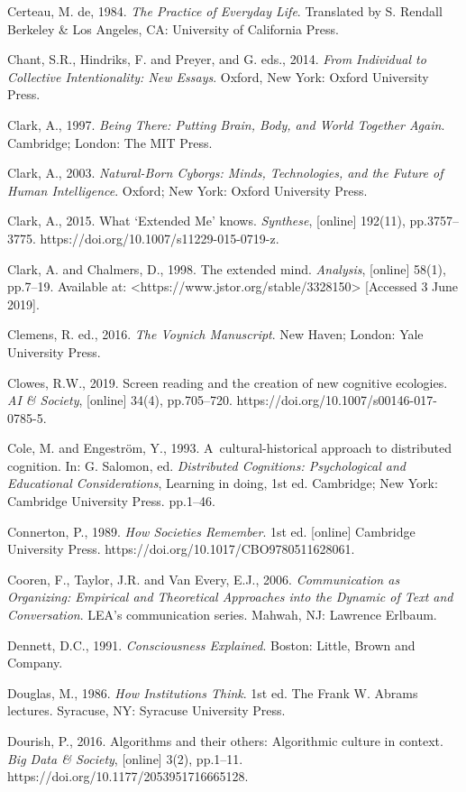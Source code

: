 Certeau, M. de, 1984. \textit{The Practice of Everyday Life}. Translated by S. Rendall Berkeley \& Los Angeles, CA: University of California Press.

Chant, S.R., Hindriks, F. and Preyer, and G. eds., 2014. \textit{From Individual to Collective Intentionality: New Essays}. Oxford, New York: Oxford University Press.

Clark, A., 1997. \textit{Being There: Putting Brain, Body, and World Together Again}. Cambridge; London: The MIT Press.

Clark, A., 2003. \textit{Natural-Born Cyborgs: Minds, Technologies, and the Future of Human Intelligence}. Oxford; New York: Oxford University Press.

Clark, A., 2015. What ‘Extended Me' knows. \textit{Synthese}, [online] 192(11), pp.3757–3775. https://doi.org/10.1007/s11229-015-0719-z.

Clark, A. and Chalmers, D., 1998. The extended mind. \textit{Analysis}, [online] 58(1), pp.7–19. Available at: {\textless}https://www.jstor.org/stable/3328150{\textgreater} [Accessed 3 June 2019].

Clemens, R. ed., 2016. \textit{The Voynich Manuscript}. New Haven; London: Yale University Press.

Clowes, R.W., 2019. Screen reading and the creation of new cognitive ecologies. \textit{AI \& Society}, [online] 34(4), pp.705–720. https://doi.org/10.1007/s00146-017-0785-5.

Cole, M. and Engeström, Y., 1993. A~cultural-historical approach to distributed cognition. In: G. Salomon, ed. \textit{Distributed Cognitions: Psychological and Educational Considerations}, Learning in doing, 1st ed. Cambridge; New York: Cambridge University Press. pp.1–46.

Connerton, P., 1989. \textit{How Societies Remember}. 1st ed. [online] Cambridge University Press. https://doi.org/10.1017/CBO9780511628061.

Cooren, F., Taylor, J.R. and Van Every, E.J., 2006. \textit{Communication as Organizing: Empirical and Theoretical Approaches into the Dynamic of Text and Conversation}. LEA's communication series. Mahwah, NJ: Lawrence Erlbaum.

Dennett, D.C., 1991. \textit{Consciousness Explained}. Boston: Little, Brown and Company.

Douglas, M., 1986. \textit{How Institutions Think}. 1st ed. The Frank W. Abrams lectures. Syracuse, NY: Syracuse University Press.

Dourish, P., 2016. Algorithms and their others: Algorithmic culture in context. \textit{Big Data \& Society}, [online] 3(2), pp.1–11. https://doi.org/10.1177/2053951716665128.

